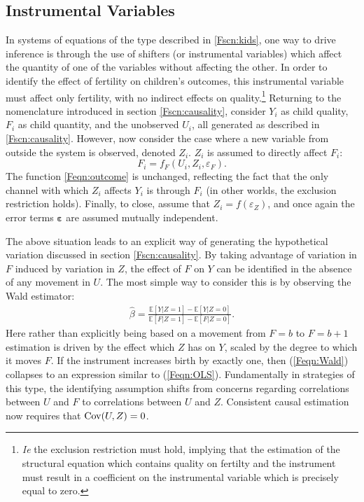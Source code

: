 \subsection{Instrumental Variables}
\label{Fsscn:kidIV}
In systems of equations of the type described in \ref{Fscn:kids}, one way to 
drive inference is through the
use of shifters (or instrumental variables) which affect the quantity of one of
the variables without affecting the other.  In order to identify the effect of 
fertility on children's outcomes, this instrumental variable must affect only 
fertility, with no indirect effects on quality.\footnote{\emph{Ie} the exclusion 
restriction must hold, implying that the estimation of the structural equation 
which contains quality on fertilty and the instrument must result in a 
coefficient on the instrumental variable which is precisely equal to zero.}
Returning to the nomenclature introduced in section \ref{Fscn:causality},
consider $Y_i$ as child quality, $F_i$ as child quantity, and the unobserved
$U_i$, all generated as described in \ref{Fscn:causality}.  However, now consider 
the case where a new variable from outside the system is observed, denoted 
$Z_i$.  $Z_i$ is assumed to directly affect $F_i$:
\[
F_i = f_F(U_i,Z_i,\varepsilon_F).
\]
The function \ref{Feqn:outcome} is unchanged, reflecting the fact that the only
channel with which $Z_i$ affects $Y_i$ is through $F_i$ (in other worlds, the 
exclusion restriction holds). Finally, to close, assume that 
$Z_i=f(\varepsilon_Z)$, and once again the error terms $\bm{\varepsilon}$ are 
assumed mutually independent.

The above situation leads to an explicit way of generating the hypothetical 
variation discussed in section \ref{Fscn:causality}.  By taking advantage of 
variation in $F$ induced by variation in $Z$, the effect of $F$ on $Y$ can
be identified in the absence of any movement in $U$.  The most simple way to
consider this is by observing the Wald estimator:
\begin{eqnarray}
\label{Feqn:Wald}
\hat\beta = \frac{\mathbb{E}[Y|Z=1]-\mathbb{E}[Y|Z=0]}{\mathbb{E}[F|Z=1]-\mathbb{E}[F|Z=0]}.
\end{eqnarray}
Here rather than explicitly being based on a movement from $F=b$ to $F=b+1$
estimation is driven by the effect which $Z$ has on $Y$, scaled by the
degree to which it moves $F$.  If the instrument increases birth by exactly
one, then (\ref{Feqn:Wald}) collapses to an expression similar to 
(\ref{Feqn:OLS}).  Fundamentally in strategies of this type, the identifying
assumption shifts from concerns regarding correlations between $U$ and $F$
to correlations between $U$ and $Z$.  Consistent causal estimation now 
requires that $\mathrm{Cov}(U,Z)=0$.

